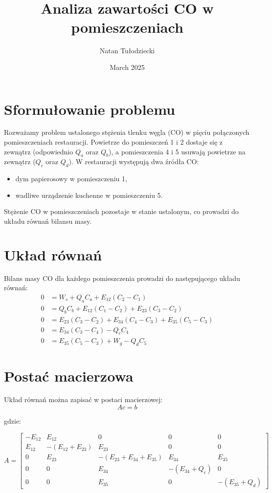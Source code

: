 \documentclass{article}
\title{Analiza zawartości CO w pomieszczeniach}
\author{Natan Tu\l odziecki}
\date{March 2025}
\begin{document}
\maketitle

\section{Sformułowanie problemu}

Rozważamy problem ustalonego stężenia tlenku węgla (CO) w pięciu połączonych pomieszczeniach restauracji. Powietrze do pomieszczeń 1 i 2 dostaje się z zewnątrz (odpowiednio $Q_a$ oraz $Q_b$), a pomieszczenia 4 i 5 usuwają powietrze na zewnątrz ($Q_c$ oraz $Q_d$). W restauracji występują dwa źródła CO: 
\begin{itemize}
    \item dym papierosowy w pomieszczeniu 1,
    \item wadliwe urządzenie kuchenne w pomieszczeniu 5.
\end{itemize}
Stężenie CO w pomieszczeniach pozostaje w stanie ustalonym, co prowadzi do układu równań bilansu masy.

\section{Układ równań}
Bilans masy CO dla każdego pomieszczenia prowadzi do następującego układu równań:
\begin{align}
    0 &= W_s + Q_a C_a + E_{12} (C_2 - C_1) \\
    0 &= Q_b C_b + E_{12} (C_1 - C_2) + E_{23} (C_3 - C_2) \\
    0 &= E_{23} (C_3 - C_2) + E_{34} (C_4 - C_3) + E_{35} (C_5 - C_3) \\
    0 &= E_{34} (C_3 - C_4) - Q_c C_4 \\
    0 &= E_{35} (C_5 - C_3) + W_g - Q_d C_5
\end{align}

\section{Postać macierzowa}
Układ równań można zapisać w postaci macierzowej:
\[ A c = b \]

gdzie:

\[
A =
\begin{bmatrix}
    -E_{12} & E_{12} & 0 & 0 & 0 \\
    E_{12} & -(E_{12} + E_{23}) & E_{23} & 0 & 0 \\
    0 & E_{23} & -(E_{23} + E_{34} + E_{35}) & E_{34} & E_{35} \\
    0 & 0 & E_{34} & - (E_{34} + Q_c) & 0 \\
    0 & 0 & E_{35} & 0 & - (E_{35} + Q_d)
\end{bmatrix}
\]
\end{document}
